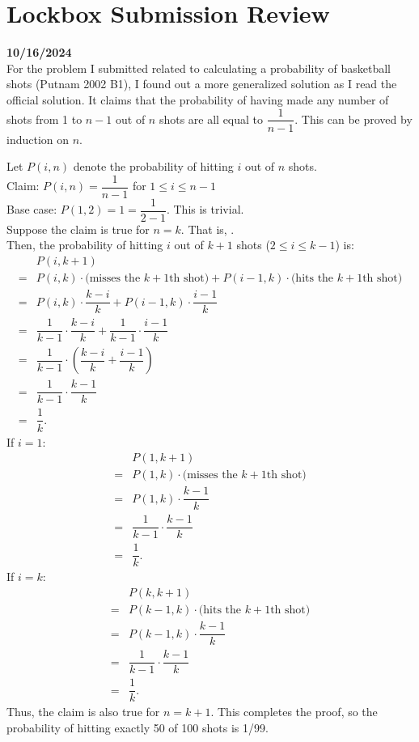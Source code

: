 \documentclass[12pt, oneside]{article}
\begin{document}
\section*{Lockbox Submission Review}
\textbf{10/16/2024}\\
For the problem I submitted related to calculating a probability of basketball shots (Putnam 2002 B1), I found out a more generalized solution as I read the official solution. It claims that the probability of having made any number of shots from 1 to $n-1$ out of $n$ shots are all equal to $\dfrac{1}{n-1}$. This can be proved by induction on $n$.

Let $P(i, n)$ denote the probability of hitting $i$ out of $n$ shots.\\
Claim: $P(i, n) = \dfrac{1}{n-1}$ for $1 \leq i \leq n-1$\\
Base case: $P(1, 2) = 1 = \dfrac{1}{2-1}$. This is trivial.\\
Suppose the claim is true for $n=k$. That is, . \\
Then, the probability of hitting $i$ out of $k+1$ shots ($2 \leq i \leq k-1$) is: 
\begin{eqnarray*}
& P(i, k+1)\\
= & P(i, k) \cdot \text{(misses the $k+1$th shot)} + P(i-1, k) \cdot \text{(hits the $k+1$th shot)}\\
= & P(i, k) \cdot \dfrac{k-i}{k} + P(i-1, k) \cdot \dfrac{i-1}{k}\\
= & \dfrac{1}{k-1} \cdot \dfrac{k-i}{k} + \dfrac{1}{k-1} \cdot \dfrac{i-1}{k}\\
= & \dfrac{1}{k-1} \cdot \left(\dfrac{k-i}{k} + \dfrac{i-1}{k}\right)\\
= & \dfrac{1}{k-1} \cdot \dfrac{k-1}{k}\\
= & \dfrac{1}{k}.
\end{eqnarray*}
If $i=1$:
\begin{eqnarray*}
& P(1, k+1)\\
= & P(1, k) \cdot \text{(misses the $k+1$th shot)}\\
= & P(1, k) \cdot \dfrac{k-1}{k}\\
= & \dfrac{1}{k-1} \cdot \dfrac{k-1}{k}\\
= & \dfrac{1}{k}.
\end{eqnarray*}
If $i=k$:
\begin{eqnarray*}
& P(k, k+1)\\
= & P(k-1, k) \cdot \text{(hits the $k+1$th shot)}\\
= & P(k-1, k) \cdot \dfrac{k-1}{k}\\
= & \dfrac{1}{k-1} \cdot \dfrac{k-1}{k}\\
= & \dfrac{1}{k}.
\end{eqnarray*}
Thus, the claim is also true for $n=k+1$. This completes the proof, so the probability of hitting exactly 50 of 100 shots is 1/99.
\end{document}
